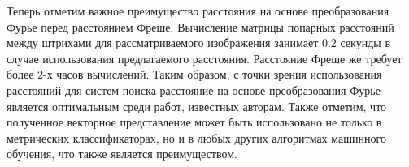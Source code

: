 \documentclass{article}
\begin{document}
Теперь отметим важное преимущество расстояния на основе преобразования Фурье перед расстоянием Фреше. Вычисление матрицы попарных расстояний между штрихами для рассматриваемого изображения занимает $0.2$ секунды в случае использования предлагаемого расстояния. Расстояние Фреше же требует более $2$-х часов вычислений. Таким образом, с точки зрения использования расстояний для систем поиска расстояние на основе преобразования Фурье является оптимальным среди работ, известных авторам. Также отметим, что полученное векторное представление может быть использовано не только в метрических классификаторах, но и в любых других алгоритмах машинного обучения, что также является преимуществом.












\end{document}
